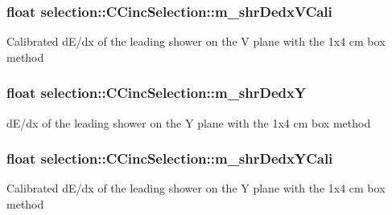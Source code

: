 \subsubsection[{\texorpdfstring{m\+\_\+shr\+Dedx\+V\+Cali}{m_shrDedxVCali}}]{\setlength{\rightskip}{0pt plus 5cm}float selection\+::\+C\+Cinc\+Selection\+::m\+\_\+shr\+Dedx\+V\+Cali\hspace{0.3cm}{\ttfamily [private]}}\hypertarget{classselection_1_1CCincSelection_a9c1276e1f839f39c0c36ca5359631863}{}\label{classselection_1_1CCincSelection_a9c1276e1f839f39c0c36ca5359631863}
Calibrated d\+E/dx of the leading shower on the V plane with the 1x4 cm box method 
\subsubsection[{\texorpdfstring{m\+\_\+shr\+DedxY}{m_shrDedxY}}]{\setlength{\rightskip}{0pt plus 5cm}float selection\+::\+C\+Cinc\+Selection\+::m\+\_\+shr\+DedxY\hspace{0.3cm}{\ttfamily [private]}}\hypertarget{classselection_1_1CCincSelection_aca70f9a6dfad2d0ed4c2ef4c71fe37bd}{}\label{classselection_1_1CCincSelection_aca70f9a6dfad2d0ed4c2ef4c71fe37bd}
d\+E/dx of the leading shower on the Y plane with the 1x4 cm box method 
\subsubsection[{\texorpdfstring{m\+\_\+shr\+Dedx\+Y\+Cali}{m_shrDedxYCali}}]{\setlength{\rightskip}{0pt plus 5cm}float selection\+::\+C\+Cinc\+Selection\+::m\+\_\+shr\+Dedx\+Y\+Cali\hspace{0.3cm}{\ttfamily [private]}}\hypertarget{classselection_1_1CCincSelection_a1b1d664e4bcff3d9e4d10596ca5039d2}{}\label{classselection_1_1CCincSelection_a1b1d664e4bcff3d9e4d10596ca5039d2}
Calibrated d\+E/dx of the leading shower on the Y plane with the 1x4 cm box method 
